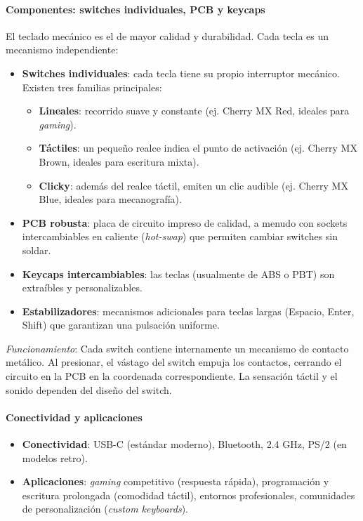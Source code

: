 \documentclass[12pt, letterpaper]{article}
\begin{document}
\paragraph{Componentes: switches individuales, PCB y keycaps}
El teclado mecánico es el de mayor calidad y durabilidad. Cada tecla es un mecanismo independiente:
\begin{itemize}
    \item \textbf{Switches individuales}: cada tecla tiene su propio interruptor mecánico. Existen tres familias principales:
    \begin{itemize}
        \item \textbf{Lineales}: recorrido suave y constante (ej. Cherry MX Red, ideales para \textit{gaming}).
        \item \textbf{Táctiles}: un pequeño realce indica el punto de activación (ej. Cherry MX Brown, ideales para escritura mixta).
        \item \textbf{Clicky}: además del realce táctil, emiten un clic audible (ej. Cherry MX Blue, ideales para mecanografía).
    \end{itemize}
    \item \textbf{PCB robusta}: placa de circuito impreso de calidad, a menudo con sockets intercambiables en caliente (\textit{hot-swap}) que permiten cambiar switches sin soldar.
    \item \textbf{Keycaps intercambiables}: las teclas (usualmente de ABS o PBT) son extraíbles y personalizables.
    \item \textbf{Estabilizadores}: mecanismos adicionales para teclas largas (Espacio, Enter, Shift) que garantizan una pulsación uniforme.
\end{itemize}
\textit{Funcionamiento}: Cada switch contiene internamente un mecanismo de contacto metálico. Al presionar, el vástago del switch empuja los contactos, cerrando el circuito en la PCB en la coordenada correspondiente. La sensación táctil y el sonido dependen del diseño del switch.

\paragraph{Conectividad y aplicaciones}
\begin{itemize}
    \item \textbf{Conectividad}: USB-C (estándar moderno), Bluetooth, 2.4 GHz, PS/2 (en modelos retro).
    \item \textbf{Aplicaciones}: \textit{gaming} competitivo (respuesta rápida), programación y escritura prolongada (comodidad táctil), entornos profesionales, comunidades de personalización (\textit{custom keyboards}).
\end{itemize}
\end{document}
